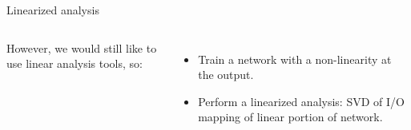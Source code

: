 \documentclass{beamer}
\begin{document}
\begin{frame}{Linearized analysis}
\begin{columns}
	However, we would still like to use linear analysis tools, so:
	\begin{itemize}
	    \item<2-> Train a network with a non-linearity at the output.
	    \item<3-> Perform a linearized analysis: SVD of I/O mapping of linear portion of network. 
	\end{itemize}
\end{columns}
\end{frame}
\end{document}
